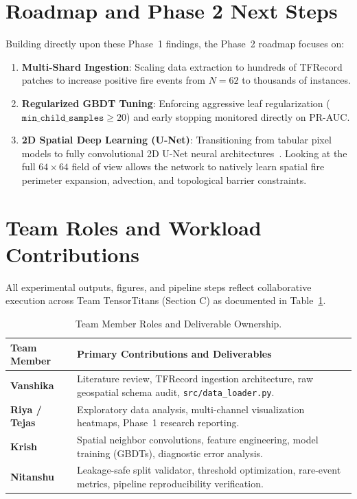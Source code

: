 \documentclass[10pt,journal,compsoc]{IEEEtran}
\begin{document}
\section{Roadmap and Phase 2 Next Steps}
Building directly upon these Phase~1 findings, the Phase~2 roadmap focuses on:
\begin{enumerate}
    \item \textbf{Multi-Shard Ingestion}: Scaling data extraction to hundreds of TFRecord patches to increase positive fire events from $N=62$ to thousands of instances.
    \item \textbf{Regularized GBDT Tuning}: Enforcing aggressive leaf regularization ($\texttt{min\_child\_samples} \ge 20$) and early stopping monitored directly on PR-AUC.
    \item \textbf{2D Spatial Deep Learning (U-Net)}: Transitioning from tabular pixel models to fully convolutional 2D U-Net neural architectures~\cite{ronneberger2015unet}. Looking at the full $64 \times 64$ field of view allows the network to natively learn spatial fire perimeter expansion, advection, and topological barrier constraints.
\end{enumerate}

\section{Team Roles and Workload Contributions}
All experimental outputs, figures, and pipeline steps reflect collaborative execution across Team TensorTitans (Section C) as documented in Table~\ref{tab:contributions}.

\begin{table}[H]
\centering
\caption{Team Member Roles and Deliverable Ownership.}
\label{tab:contributions}
\begin{tabularx}{\columnwidth}{lX}
\toprule
\textbf{Team Member} & \textbf{Primary Contributions and Deliverables} \\
\midrule
\textbf{Vanshika} & Literature review, TFRecord ingestion architecture, raw geospatial schema audit, \texttt{src/data\_loader.py}. \\
\textbf{Riya / Tejas} & Exploratory data analysis, multi-channel visualization heatmaps, Phase~1 research reporting. \\
\textbf{Krish} & Spatial neighbor convolutions, feature engineering, model training (GBDTs), diagnostic error analysis. \\
\textbf{Nitanshu} & Leakage-safe split validator, threshold optimization, rare-event metrics, pipeline reproducibility verification. \\
\bottomrule
\end{tabularx}
\end{table}
\end{document}
